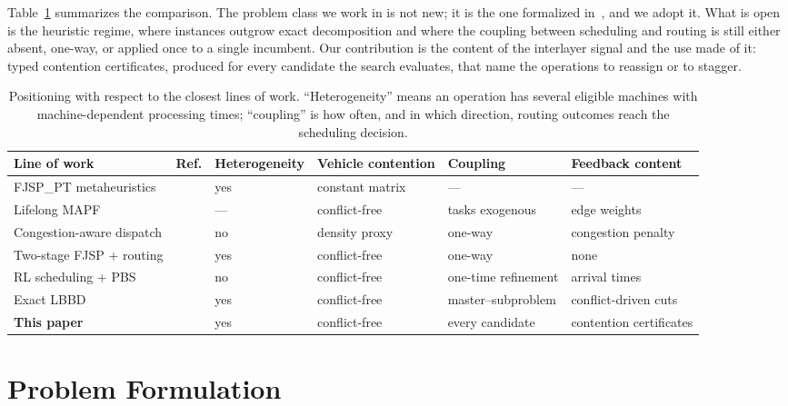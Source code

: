 \documentclass[manuscript,screen,review]{acmart}
\begin{document}
Table~\ref{tab:related} summarizes the comparison. The problem class we work in
is not new; it is the one formalized in~\cite{vanos2026exact}, and we adopt it.
What is open is the heuristic regime, where instances outgrow exact
decomposition and where the coupling between scheduling and routing is still
either absent, one-way, or applied once to a single incumbent. Our contribution
is the content of the interlayer signal and the use made of it: typed contention
certificates, produced for every candidate the search evaluates, that name the
operations to reassign or to stagger.

\begin{table}[t]
\caption{Positioning with respect to the closest lines of work.
``Heterogeneity'' means an operation has several eligible machines with
machine-dependent processing times; ``coupling'' is how often, and in which
direction, routing outcomes reach the scheduling decision.}
\label{tab:related}
\footnotesize
\begin{tabular}{@{}lcllll@{}}
\toprule
Line of work & Ref. & Heterogeneity & Vehicle contention & Coupling & Feedback content \\
\midrule
FJSP\_PT metaheuristics & \cite{meng2025cp,qin2026knowledge,fu2025integrated}
  & yes & constant matrix & --- & --- \\
Lifelong MAPF & \cite{zhang2024guidance}
  & --- & conflict-free & tasks exogenous & edge weights \\
Congestion-aware dispatch & \cite{kim2026congestion}
  & no & density proxy & one-way & congestion penalty \\
Two-stage FJSP + routing & \cite{sun2023integrated}
  & yes & conflict-free & one-way & none \\
RL scheduling + PBS & \cite{li2026framework}
  & no & conflict-free & one-time refinement & arrival times \\
Exact LBBD & \cite{vanos2026exact}
  & yes & conflict-free & master--subproblem & conflict-driven cuts \\
\textbf{This paper} &
  & yes & conflict-free & every candidate & contention certificates \\
\bottomrule
\end{tabular}
\end{table}


\section{Problem Formulation}
\label{sec:Chapter_III}
\end{document}
